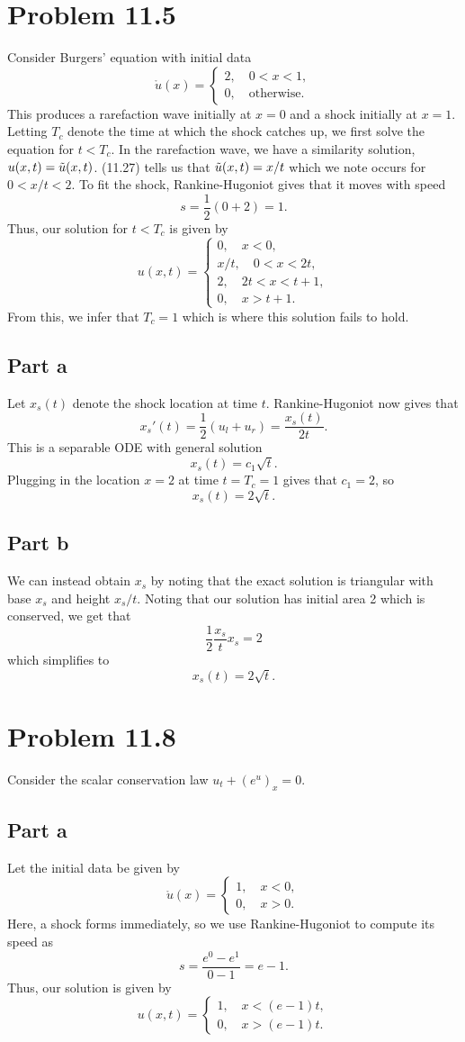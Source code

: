 \documentclass{article}
\begin{document}
\section{Problem 11.5}
Consider Burgers' equation with initial data
\[
\mathring{u}(x)=\begin{cases}
	2,\quad0<x<1,\\
	0,\quad\text{otherwise}.
\end{cases}
\]
This produces a rarefaction wave initially at $x=0$ and a shock initially at $x=1$. Letting $T_c$ denote the time at which the shock catches up, we first solve the equation for $t<T_c$. In the rarefaction wave, we have a similarity solution, $u(x,t)=\Tilde u(x,t)$. (11.27) tells us that $\Tilde u(x,t)=x/t$ which we note occurs for $0<x/t<2$. To fit the shock, Rankine-Hugoniot gives that it moves with speed
\[
s=\frac{1}{2}(0+2)=1.
\]
Thus, our solution for $t<T_c$ is given by
\[
u(x,t)=\begin{cases}
	0,\quad x<0,\\
	x/t,\quad 0<x<2t,\\
	2,\quad 2t<x<t+1,\\
	0,\quad x>t+1.
\end{cases}
\]
From this, we infer that $T_c=1$ which is where this solution fails to hold.
\subsection{Part a}
Let $x_s(t)$ denote the shock location at time $t$. Rankine-Hugoniot now gives that
\[
x_s'(t)=\frac{1}{2}(u_l+u_r)=\frac{x_s(t)}{2t}.
\]
This is a separable ODE with general solution
\[
x_s(t)=c_1\sqrt{t}.
\]
Plugging in the location $x=2$ at time $t=T_c=1$ gives that $c_1=2$, so
\[
x_s(t)=2\sqrt{t}.
\]
\subsection{Part b}
We can instead obtain $x_s$ by noting that the exact solution is triangular with base $x_s$ and height $x_s/t$. Noting that our solution has initial area 2 which is conserved, we get that
\[
\frac{1}{2}\frac{x_s}{t}x_s=2
\]
which simplifies to
\[
x_s(t)=2\sqrt{t}.
\]

\section{Problem 11.8}
Consider the scalar conservation law $u_t+(e^u)_x=0$.
\subsection{Part a}
Let the initial data be given by
\[
\mathring u(x)=\begin{cases}
1,\quad x<0,\\
0,\quad x>0.
\end{cases}
\]
Here, a shock forms immediately, so we use Rankine-Hugoniot to compute its speed as
\[
s=\frac{e^0-e^1}{0-1}=e-1.
\]
Thus, our solution is given by
\[
u(x,t)=\begin{cases}
	1,\quad x<(e-1)t,\\
	0,\quad x>(e-1)t.
\end{cases}
\]
\end{document}
